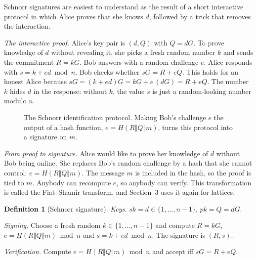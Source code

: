 \documentclass[11pt,a4paper]{article}
\theoremstyle{definition}
\newtheorem{definition}{Definition}[section]
\newcommand{\sk}{\mathit{sk}}
\newcommand{\pk}{\mathit{pk}}
\newcommand{\Hash}{H}
\begin{document}
Schnorr signatures are easiest to understand as the result of a short interactive protocol in which Alice proves that she knows $d$, followed by a trick that removes the interaction.

\emph{The interactive proof.} Alice's key pair is $(d,Q)$ with $Q=dG$. To prove knowledge of $d$ without revealing it, she picks a fresh random number $k$ and sends the commitment $R=kG$. Bob answers with a random challenge $e$. Alice responds with $s=k+ed \bmod n$. Bob checks whether $sG = R + eQ$. This holds for an honest Alice because $sG=(k+ed)G=kG+e\,(dG)=R+eQ$. The number $k$ hides $d$ in the response: without $k$, the value $s$ is just a random-looking number modulo $n$.

\begin{figure}[h]
\centering
{}
\caption{The Schnorr identification protocol. Making Bob's challenge $e$ the output of a hash function, $e=\Hash(R\Vert Q\Vert m)$, turns this protocol into a signature on $m$.}
\end{figure}

\emph{From proof to signature.} Alice would like to prove her knowledge of $d$ without Bob being online. She replaces Bob's random challenge by a hash that she cannot control: $e=\Hash(R\Vert Q\Vert m)$. The message $m$ is included in the hash, so the proof is tied to $m$. Anybody can recompute $e$, so anybody can verify. This transformation is called the Fiat--Shamir transform, and Section~3 uses it again for lattices.

\begin{definition}[Schnorr signature]
\emph{Keys.} $\sk=d\in\{1,\dots,n-1\}$, $\pk=Q=dG$.

\emph{Signing.} Choose a fresh random $k\in\{1,\dots,n-1\}$ and compute $R=kG$, $e=\Hash(R\Vert Q\Vert m) \bmod n$ and $s=k+ed \bmod n$. The signature is $(R,s)$.

\emph{Verification.} Compute $e=\Hash(R\Vert Q\Vert m) \bmod n$ and accept iff $sG=R+eQ$.
\end{definition}
\end{document}

